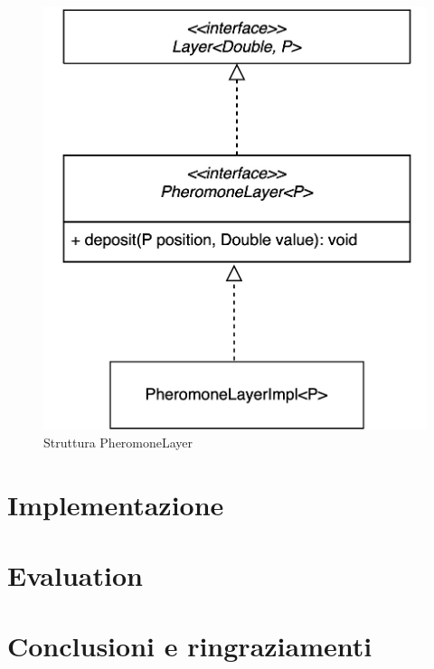 \documentclass[12pt,a4paper,openright,twoside]{book}
\begin{document}
\begin{figure}[h!]
    \centering
    \includegraphics[width=.8\linewidth]{figures/pheromoneLayer.jpeg}
    \caption{Struttura PheromoneLayer}\label{fig:phLayer}
\end{figure}

%

\chapter{Implementazione}

\chapter{Evaluation}
\chapter{Conclusioni e ringraziamenti}

\backmatter\nocite{*} %



\end{document}
